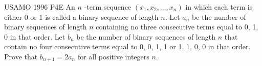 {USAMO 1996 P4}{E}{
    An $ n $ -term sequence $ (x_1, x_2, \ldots, x_n) $ in which each term
    is either 0 or 1 is called a binary sequence of length $ n $. Let $ a_n $ be
    the number of binary sequences of length $ n $ containing no three consecutive
    terms equal to 0, 1, 0 in that order. Let $ b_n $ be the number of binary
    sequences of length $ n $ that contain no four consecutive terms equal to 0,
    0, 1, 1 or 1, 1, 0, 0 in that order. Prove that $ b_{n+1} = 2a_n $ for all
    positive integers $ n $.
}\label{problem:bijection_4}

